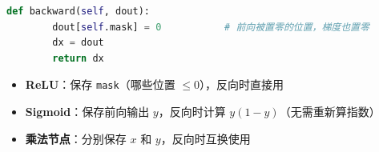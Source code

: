 \documentclass[a4paper,11pt]{ctexart}
\begin{document}
\begin{solutionbox}[参考答案与详细解析]
\begin{lstlisting}[language=Python]
    def backward(self, dout):
        dout[self.mask] = 0           # 前向被置零的位置，梯度也置零
        dx = dout
        return dx
    \end{lstlisting}

    \begin{keybox}
        \begin{itemize}
            \item \textbf{ReLU}：保存 \texttt{mask}（哪些位置 $\leq 0$），反向时直接用
            \item \textbf{Sigmoid}：保存前向输出 $y$，反向时计算 $y(1-y)$（无需重新算指数）
            \item \textbf{乘法节点}：分别保存 $x$ 和 $y$，反向时互换使用
        \end{itemize}
    \end{keybox}
\end{solutionbox}
\end{document}
